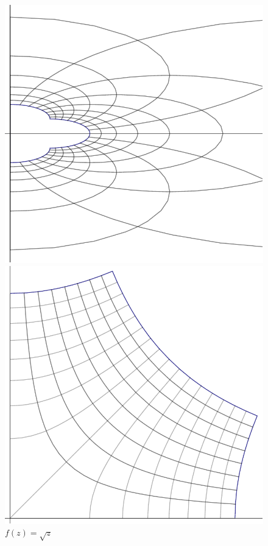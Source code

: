\begin{example}
\begin{center}
\begin{figure}[htbp]
  \bigskip
  \begin{minipage}{.45\textwidth}
  \includegraphics[width=.8\textwidth]{Graphics/conf3.pdf}
  \caption*{$f(z)=1/z$}
  \end{minipage}
  \begin{minipage}{.45\textwidth}
  \includegraphics[width=.8\textwidth]{Graphics/conf4.pdf}
  \caption*{$f(z)=\sqrt{z}$}
  \end{minipage}
  \end{figure}
\end{center}
\end{example}


